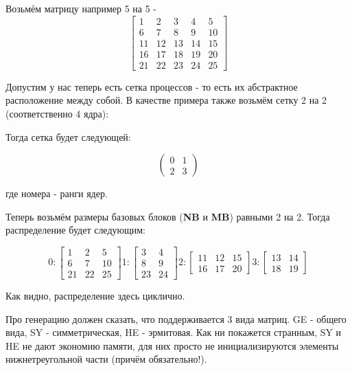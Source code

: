 \documentclass[12pt,fleqn]{article}
\begin{document}
        Возьмём матрицу например 5 на 5 - 
        $$
        \begin{bmatrix}
        1 & 2 & 3 & 4 & 5\\
        6 & 7 & 8 & 9 & 10\\
        11 & 12 & 13 & 14 & 15\\
        16 & 17 & 18 & 19 & 20\\
        21 & 22 & 23 & 24 & 25
        \end{bmatrix}
        $$

        Допустим у нас теперь есть сетка процессов - то есть их абстрактное расположение между собой.
        В качестве примера также возьмём сетку 2 на 2 (соответственно 4 ядра):

        Тогда сетка будет следующей:

        $$
        \begin{pmatrix}
        0 & 1\\
        2 & 3
        \end{pmatrix}
        $$

        где номера - ранги ядер.

        Теперь возьмём размеры базовых блоков (\textbf{NB} и \textbf{MB}) равными 2 на 2. Тогда распределение будет следующим:

        $$
        0: \begin{bmatrix}
           1 & 2 & 5\\
           6 & 7 & 10\\
           21 & 22 & 25
           \end{bmatrix}
        1: \begin{bmatrix}
            3 & 4\\
            8 & 9\\
            23 & 24
            \end{bmatrix}
        2: \begin{bmatrix}
            11 & 12 & 15\\
            16 & 17 & 20
            \end{bmatrix}
        3: \begin{bmatrix}
            13 & 14\\
            18 & 19
            \end{bmatrix}
        $$

        Как видно, распределение здесь циклично.
        
        Про генерацию должен сказать, что поддерживается 3 вида матриц. GE - общего вида, SY - симметрическая, HE - эрмитовая. Как ни покажется странным, SY и HE не дают экономию памяти,
         для них просто не инициализируются элементы нижнетреугольной части (причём обязательно!).
\end{document}
